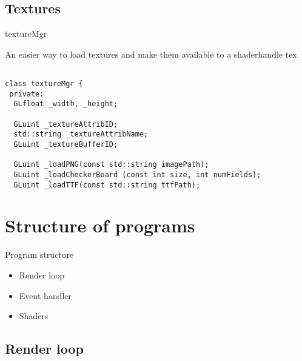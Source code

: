 \documentclass[12pt]{article}
\begin{document}
\subsection{Textures}

\begin{frame}[fragile]{textureMgr}

An easier way to load textures and make them available to a shaderhandle tex

\begin{verbatim}

class textureMgr {
 private:
  GLfloat _width, _height;

  GLuint _textureAttribID;
  std::string _textureAttribName;
  GLuint _textureBufferID;

  GLuint _loadPNG(const std::string imagePath);
  GLuint _loadCheckerBoard (const int size, int numFields);
  GLuint _loadTTF(const std::string ttfPath);
\end{verbatim}


\end{frame}

\section{Structure of programs}

\begin{frame}{Program structure}

\begin{center}
\begin{minipage}{0.5\columnwidth}
\begin{itemize}
\item Render loop
\item Event handler
\item Shaders
\end{itemize}
\end{minipage}
\end{center}
\end{frame}

\subsection{Render loop}
\end{document}
